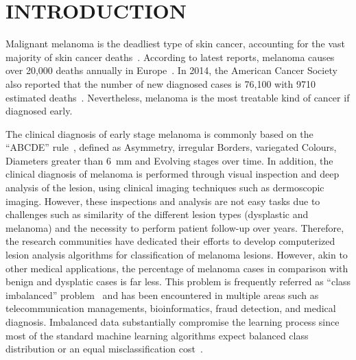 \graphicspath{ {./content/intro/figures/} }

\section{\uppercase{Introduction}}
\label{sec:intro}  %

\noindent Malignant melanoma is the deadliest type of skin cancer, accounting for the vast majority of skin cancer deaths~\cite{CancerFactsFigures2014}. 
According to latest reports, melanoma causes over 20,000 deaths annually in Europe~\cite{forsea2012melanoma}. 
In 2014, the American Cancer Society also reported that the number of new diagnosed cases is 76,100 with 9710 estimated deaths~\cite{CancerFactsFigures2014}. 
Nevertheless, melanoma is the most treatable kind of cancer if diagnosed early. 

The clinical diagnosis of early stage melanoma is commonly based on the ``ABCDE'' rule~\cite{abbasi2004early}, defined as Asymmetry, irregular Borders, variegated Colours, Diameters greater than \SI{6}{\milli \metre} and Evolving stages over time. 
In addition, the clinical diagnosis of melanoma is performed through visual inspection and deep analysis of the lesion, using clinical imaging techniques such as dermoscopic imaging. 
However, these inspections and analysis are not easy tasks due to challenges such as similarity of the different lesion types (dysplastic and melanoma) and the necessity to perform patient follow-up over years.
Therefore, the research communities have dedicated their efforts to develop computerized lesion analysis algorithms for classification of melanoma lesions. 
However, akin to other medical applications, the percentage of melanoma cases in comparison with benign and dysplatic cases is far less. 
This problem is frequently referred as ``class imbalanced'' problem~\cite{prati2009data} and has been encountered in multiple areas such as telecommunication managements, bioinformatics, fraud detection, and medical diagnosis. 
Imbalanced data substantially compromise the learning process since most of the standard machine learning algorithms expect balanced class distribution or an equal misclassification cost~\cite{he2009learning}.

